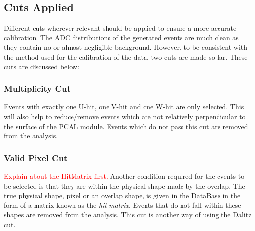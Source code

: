 \subsection{Cuts Applied}
Different cuts wherever relevant should be applied to ensure a more accurate calibration. The ADC distributions of the 
generated events are much clean as they contain no or almost negligible background. However, to be consistent with the method
used for the calibration of the data, two cuts are made so far. These cuts are discussed below:

\subsubsection{Multiplicity Cut}
Events with exactly one U-hit, one V-hit and one W-hit are only selected. This will also help to reduce/remove events which are not
relatively perpendicular to the surface of the PCAL module. Events which do not pass this cut are removed from the analysis.

\subsubsection{Valid Pixel Cut}
\textcolor{red}{Explain about the HitMatrix first.} Another condition required for the events to be selected is that they are
within the physical shape made by the overlap. The true physical shape, pixel or an overlap shape, is given in the DataBase in the 
form of a matrix known as the \textit{hit-matrix}. Events that do not fall within these shapes are removed from the analysis. This cut
is another way of using the Dalitz cut.

\FloatBarrier
